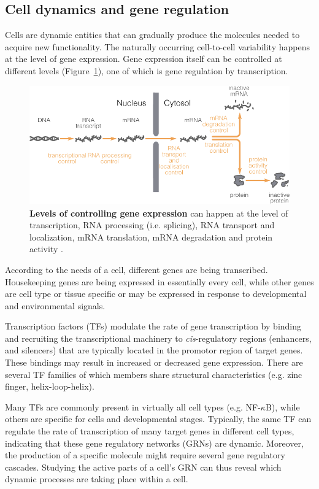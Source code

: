 \subsection{Cell dynamics and gene regulation}
Cells are dynamic entities that can gradually produce the molecules needed to acquire new functionality. The naturally occurring cell-to-cell variability happens at the level of gene expression. Gene expression itself can be controlled at different levels (Figure~\ref{fig:controlexpression}), one of which is gene regulation by transcription.

\begin{figure}[htb!]
	\centering\includegraphics[width=.8\linewidth]{fig/control_gene_expression} %
	\caption{
		\textbf{Levels of controlling gene expression} can happen at the level of transcription, RNA processing (i.e. splicing), RNA transport and localization, mRNA translation, mRNA degradation and protein activity \cite{alberts_overviewgenecontrol_2002}.
	}
	\label{fig:controlexpression}
\end{figure}

According to the needs of a cell, different genes are being transcribed. Housekeeping genes are being expressed in essentially every cell, while other genes are cell type or tissue specific or may be expressed in response to developmental and environmental signals\cite{strachan_humanmoleculargenetics_2011}. 

Transcription factors (TFs) modulate the rate of gene transcription by binding and recruiting the transcriptional machinery to \emph{cis}-regulatory regions (enhancers, and silencers) that are typically located in the promotor region of target genes. These bindings may result in increased or decreased gene expression. 
There are several TF families of which members share structural characteristics (e.g. zinc finger, helix-loop-helix).

Many TFs are commonly present in virtually all cell types (e.g. NF-$\kappa$B), while others are specific for cells and developmental stages\cite{lambert_humantranscriptionfactors_2018}. Typically, the same TF can regulate the rate of transcription of many target genes in different cell types, indicating that these gene regulatory networks (GRNs) are dynamic. Moreover, the production of a specific molecule might require several gene regulatory cascades. Studying the active parts of a cell's GRN can thus reveal which dynamic processes are taking place within a cell.

